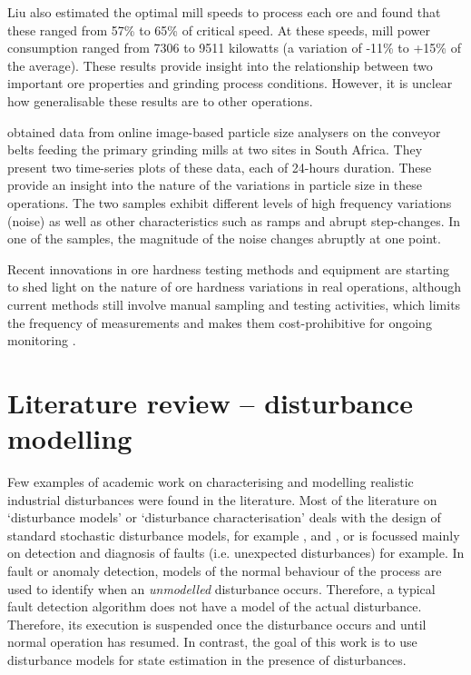 Liu also estimated the optimal mill speeds to process each ore and found that these ranged from 57\% to 65\% of critical speed. At these speeds, mill power consumption ranged from 7306 to 9511 kilowatts (a variation of -11\% to +15\% of the average). These results provide insight into the relationship between two important ore properties and grinding process conditions. However, it is unclear how generalisable these results are to other operations.

\cite{steyn_investigating_2018} obtained data from online image-based particle size analysers on the conveyor belts feeding the primary grinding mills at two sites in South Africa. They present two time-series plots of these data, each of 24-hours duration. These provide an insight into the nature of the variations in particle size in these operations. The two samples exhibit different levels of high frequency variations (noise) as well as other characteristics such as ramps and abrupt step-changes. In one of the samples, the magnitude of the noise changes abruptly at one point.

Recent innovations in ore hardness testing methods and equipment are starting to shed light on the nature of ore hardness variations in real operations, although current methods still involve manual sampling and testing activities, which limits the frequency of measurements and makes them cost-prohibitive for ongoing monitoring \citep{kojovic_value_2019}.


\section{Literature review – disturbance modelling}

Few examples of academic work on characterising and modelling realistic industrial disturbances were found in the literature. Most of the literature on `disturbance models' or `disturbance characterisation' deals with the design of standard stochastic disturbance models, for example \cite{muske_disturbance_2002}, and \cite{pannocchia_robust_2003}, or is focussed mainly on detection and diagnosis of faults (i.e. unexpected disturbances) \citep{thornhill_advances_2007} for example. In fault or anomaly detection, models of the normal behaviour of the process are used to identify when an \textit{unmodelled} disturbance occurs. Therefore, a typical fault detection algorithm does not have a model of the actual disturbance. Therefore, its execution is suspended once the disturbance occurs and until normal operation has resumed. In contrast, the goal of this work is to use disturbance models for state estimation in the presence of disturbances.

